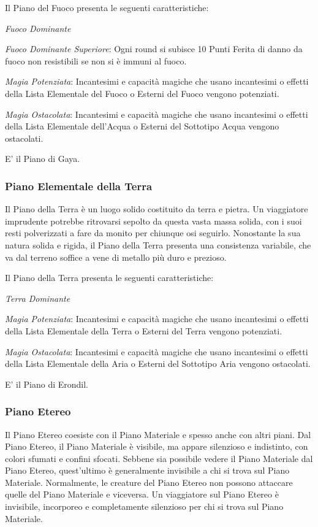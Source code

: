 \documentclass[a4paper,twoside,openany]{book}
\begin{document}
\begin{multicols}{2}
Il Piano del Fuoco presenta le seguenti caratteristiche:

\emph{Fuoco Dominante}

\emph{Fuoco Dominante Superiore}: Ogni round si subisce 10 Punti Ferita di danno da fuoco non resistibili se non si è immuni al fuoco.

\emph{Magia Potenziata}: Incantesimi e capacità magiche che usano incantesimi o effetti della Lista Elementale del Fuoco o Esterni del Fuoco vengono potenziati.

\emph{Magia Ostacolata}: Incantesimi e capacità magiche che usano incantesimi o effetti della Lista Elementale dell'Acqua o Esterni del Sottotipo Acqua vengono ostacolati.

E' il Piano di Gaya.

\subsubsection{Piano Elementale della Terra}\label{pianoterra}
Il Piano della Terra è un luogo solido costituito da terra e pietra. Un viaggiatore imprudente potrebbe ritrovarsi sepolto da questa vasta massa solida, con i suoi resti polverizzati a fare da monito per chiunque osi seguirlo. Nonostante la sua natura solida e rigida, il Piano della Terra presenta una consistenza variabile, che va dal terreno soffice a vene di metallo più duro e prezioso.

Il Piano della Terra presenta le seguenti caratteristiche:

\emph{Terra Dominante}

\emph{Magia Potenziata}: Incantesimi e capacità magiche che usano incantesimi o effetti della Lista Elementale della Terra o Esterni del Terra vengono potenziati.

\emph{Magia Ostacolata}: Incantesimi e capacità magiche che usano incantesimi o effetti della Lista Elementale della Aria o Esterni del Sottotipo Aria vengono ostacolati.

E' il Piano di Erondil.

\subsubsection{Piano Etereo}\label{pianoetereo}
Il Piano Etereo coesiste con il Piano Materiale e spesso anche con altri piani. Dal Piano Etereo, il Piano Materiale è visibile, ma appare silenzioso e indistinto, con colori sfumati e confini sfocati. Sebbene sia possibile vedere il Piano Materiale dal Piano Etereo, quest'ultimo è generalmente invisibile a chi si trova sul Piano Materiale. Normalmente, le creature del Piano Etereo non possono attaccare quelle del Piano Materiale e viceversa. Un viaggiatore sul Piano Etereo è invisibile, incorporeo e completamente silenzioso per chi si trova sul Piano Materiale.


\end{multicols}
\end{document}

